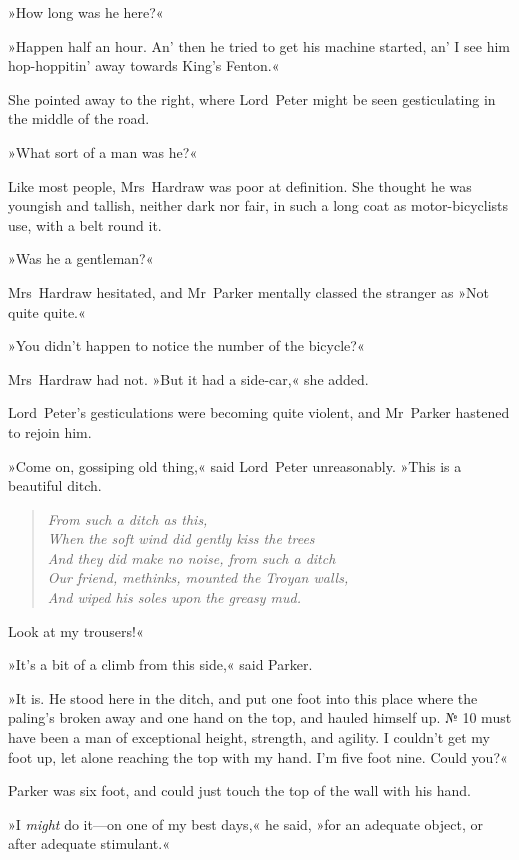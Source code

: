 »How long was he here?«

»Happen half an hour. An' then he tried to get his machine started, an' I see him hop-hoppitin' away towards King's Fenton.«

She pointed away to the right, where Lord~Peter might be seen gesticulating in the middle of the road.

»What sort of a man was he?«

Like most people, Mrs~Hardraw was poor at definition. She thought he was youngish and tallish, neither dark nor fair, in such a long coat as motor-bicyclists use, with a belt round it.

»Was he a gentleman?«

Mrs~Hardraw hesitated, and Mr~Parker mentally classed the stranger as »Not quite quite.«

»You didn't happen to notice the number of the bicycle?«

Mrs~Hardraw had not. »But it had a side-car,« she added.

Lord~Peter's gesticulations were becoming quite violent, and Mr~Parker hastened to rejoin him.

»Come on, gossiping old thing,« said Lord~Peter unreasonably. »This is a beautiful ditch.
\vspace{-2ex}
\begin{quote}\itshape
From such a ditch as this,\\
When the soft wind did gently kiss the trees\\
And they did make no noise, from such a ditch\\
Our friend, methinks, mounted the Troyan walls,\\
And wiped his soles upon the greasy mud.\\
\end{quote}
\vspace{-5ex}
Look at my trousers!«

»It's a bit of a climb from this side,« said Parker.

»It is. He stood here in the ditch, and put one foot into this place where the paling's broken away and one hand on the top, and hauled himself up. № 10 must have been a man of exceptional height, strength, and agility. I couldn't get my foot up, let alone reaching the top with my hand. I'm five foot nine. Could you?«

Parker was six foot, and could just touch the top of the wall with his hand.

»I \textit{might} do it—on one of my best days,« he said, »for an adequate object, or after adequate stimulant.«

